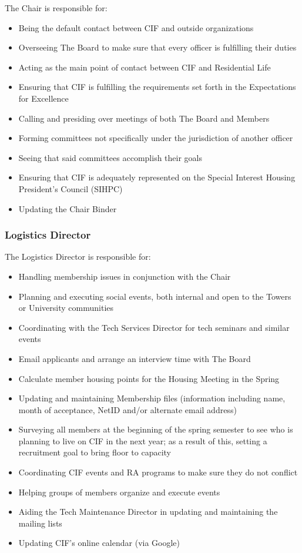 The Chair is responsible for:
\begin{itemize}
	\item Being the default contact between CIF and outside organizations
	\item Overseeing The Board to make sure that every officer is fulfilling their duties
	\item Acting as the main point of contact between CIF and Residential Life
	\item Ensuring that CIF is fulfilling the requirements set forth in the Expectations for Excellence
	\item Calling and presiding over meetings of both The Board and Members
	\item Forming committees not specifically under the jurisdiction of another officer
	\item Seeing that said committees accomplish their goals
	\item Ensuring that CIF is adequately represented on the Special Interest Housing President's Council (SIHPC)
	\item Updating the Chair Binder
\end{itemize}



		\subsubsection{Logistics Director}\label{ssub:logistics-director}

The Logistics Director is responsible for:
\begin{itemize}
	\item Handling membership issues in conjunction with the Chair
	\item Planning and executing social events, both internal and open to the Towers or University communities
	\item Coordinating with the Tech Services Director for tech seminars and similar events
	\item Email applicants and arrange an interview time with The Board
	\item Calculate member housing points for the Housing Meeting in the Spring
	\item Updating and maintaining Membership files (information including name, month of acceptance, NetID and/or alternate email address)
	\item Surveying all members at the beginning of the spring semester to see who is planning to live on CIF in the next year; as a result of this, setting a recruitment goal to bring floor to capacity
	\item Coordinating CIF events and RA programs to make sure they do not conflict
	\item Helping groups of members organize and execute events
	\item Aiding the Tech Maintenance Director in updating and maintaining the mailing lists
	\item Updating CIF's online calendar (via Google)
\end{itemize}



